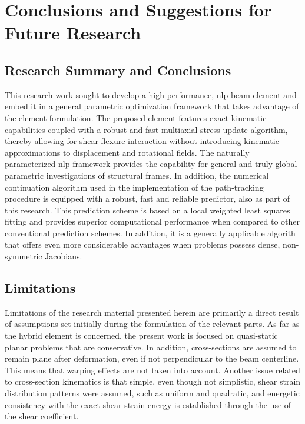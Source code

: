\chapter{Conclusions and Suggestions for Future Research}

\section{Research Summary and Conclusions}
This research work sought to develop a high-performance, \acrshort{nlp} beam element 
and embed it in a general parametric optimization framework that takes advantage of 
the element formulation. The proposed element features exact kinematic capabilities 
coupled with a robust and fast multiaxial stress update algorithm, thereby allowing 
for shear-flexure interaction without introducing kinematic approximations to 
displacement and rotational fields. The naturally parameterized \acrshort{nlp} 
framework provides the capability for general and truly global parametric 
investigations of structural frames. In addition, the numerical continuation algorithm 
used in the implementation of the path-tracking procedure is equipped with a robust, 
fast and reliable predictor, also as part of this research. This prediction scheme is 
based on a local weighted least squares fitting and provides superior computational 
performance when compared to other conventional prediction schemes. In addition, it is 
a generally applicable algorith that offers even more considerable advantages when 
problems possess dense, non-symmetric Jacobians.

\section{Limitations}

Limitations of the research material presented herein are primarily a direct result of 
assumptions set initially during the formulation of the relevant parts. As far as the 
hybrid element is concerned, the present work is focused on quasi-static planar 
problems that are conservative. In addition, cross-sections are assumed to remain 
plane after deformation, even if not perpendicular to the beam centerline. This means 
that warping effects are not taken into account. Another issue related to 
cross-section 
kinematics is that simple, even though not simplistic, shear strain distribution 
patterns 
were assumed, such as uniform and quadratic, and energetic consistency with the exact 
shear strain energy is established through the use of the shear coefficient.

